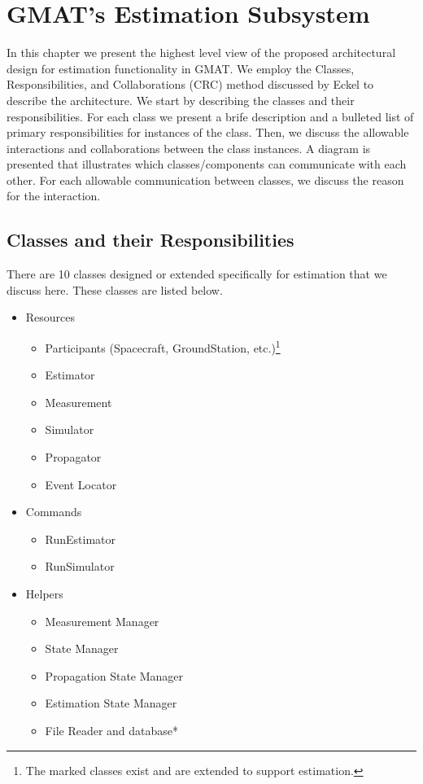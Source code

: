 \chapter{GMAT's Estimation Subsystem}


In this chapter we present the highest level view of the proposed architectural design for
estimation functionality in GMAT.   We employ the Classes, Responsibilities, and Collaborations
(CRC) method discussed by Eckel\cite{thinkC} to describe the architecture.  We start by describing
the classes and their responsibilities.  For each class we present a brife description and a
bulleted list of primary responsibilities for instances of the class.  Then, we discuss the
allowable interactions and collaborations between the class instances.   A diagram is presented that
illustrates which classes/components can communicate with each other.  For each allowable
communication between classes, we discuss the reason for the interaction.

\section{Classes and their Responsibilities}

There are 10 classes designed or extended specifically for estimation that we discuss here.  These
classes are listed below.

\begin{itemize}
\item Resources
\begin{itemize}
\item Participants (Spacecraft, GroundStation, etc.)\footnote{The marked classes exist and are
extended to support estimation.}
\item Estimator
\item Measurement
\item Simulator
\item Propagator\footnotemark[\value{footnote}]
\item Event Locator
\end{itemize}
\item Commands
\begin{itemize}
\item RunEstimator
\item RunSimulator
\end{itemize}
\item Helpers
\begin{itemize}
\item Measurement Manager
\item State Manager
\item Propagation State Manager\footnotemark[\value{footnote}]
\item Estimation State Manager
\item File Reader and database*
\end{itemize}
\end{itemize}

